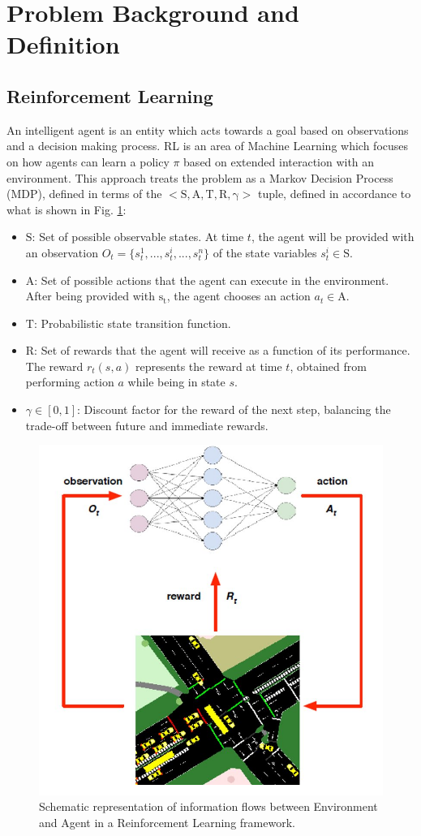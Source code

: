 \documentclass{article}
\begin{document}
\section{Problem Background and Definition} \label{problem}
\subsection{Reinforcement Learning}
An intelligent agent is an entity which acts towards a goal based on observations and a decision making process. RL is an area of Machine Learning which focuses on how agents can learn a policy $\pi$ based on extended interaction with an environment.
This approach treats the problem as a Markov Decision Process (MDP), defined in terms of the  $\mathrm{<S, A, T, R, \gamma>}$ tuple, defined in accordance to what is shown in Fig. \ref{fig:RL}:
\begin{itemize}
    \item $\mathrm{S}$: Set of possible observable states. At time $t$, the agent will be provided with an observation $O_t=\{s^1_t, ..., s^i_t, ..., s^n_t\}$ of the state variables $s^i_t \in \mathrm{S}$.
    
    \item $\mathrm{A}$: Set of possible actions that the agent can execute in the environment. After being provided with $\mathrm{s_t}$, the agent chooses an action $a_t \in \mathrm{A}$.
    
    \item $\mathrm{T}$: Probabilistic state transition function.
    
    \item $\mathrm{R}$: Set of rewards that the agent will receive as a function of its performance. The reward $r_t(s,a)$ represents the reward at time $t$, obtained from performing action $a$ while being in state $s$.
    
    \item $\gamma \in [0,1]$: Discount factor for the reward of the next step, balancing the trade-off between future and immediate rewards.
\end{itemize}

\begin{figure}[thpb]
    \centering
    \includegraphics[width=0.5\linewidth]{figures/rl.PNG}
    \caption{Schematic representation of information flows between Environment and Agent in a Reinforcement Learning framework.}
    \label{fig:RL}
\end{figure}
\end{document}
